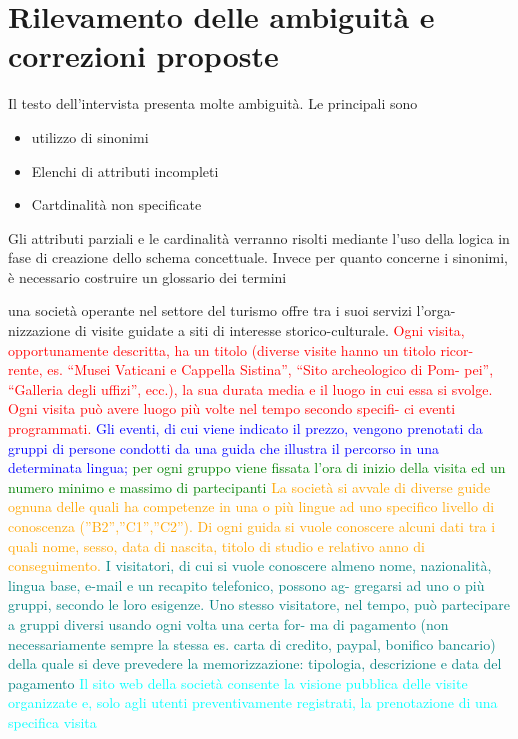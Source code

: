 \documentclass[a4paper,12pt]{report}
\begin{document}
\section{Rilevamento delle ambiguità e correzioni proposte}
Il testo dell'intervista presenta molte ambiguità. Le principali sono
\begin{itemize}
    \item utilizzo di sinonimi
    \item Elenchi di attributi incompleti
    \item Cartdinalità non specificate
\end{itemize}

Gli attributi parziali e le cardinalità verranno risolti mediante l'uso della logica in fase di creazione dello schema concettuale.
Invece per quanto concerne i sinonimi, è necessario costruire un glossario dei termini



una società operante nel settore del turismo offre tra i suoi servizi l’orga-
nizzazione di visite guidate a siti di interesse storico-culturale.
\textcolor{red}{ Ogni visita,
opportunamente descritta, ha un titolo (diverse visite hanno un titolo ricor-
rente, es. “Musei Vaticani e Cappella Sistina”, “Sito archeologico di Pom-
pei”, “Galleria degli uffizi”, ecc.), la sua durata media e il luogo in cui essa
si svolge. Ogni visita può avere luogo più volte nel tempo secondo specifi-
ci eventi programmati. } 
\textcolor{blue}{Gli eventi, di cui viene indicato il prezzo, vengono
prenotati da gruppi di persone condotti da una guida che illustra il percorso
in una determinata lingua;} 
\textcolor{green}{per ogni gruppo viene fissata l’ora di inizio della
visita ed un numero minimo e massimo di partecipanti} 
\textcolor{orange}{La società si avvale
di diverse guide ognuna delle quali ha competenze in una o più 
lingue ad
uno specifico livello di conoscenza (”B2”,”C1”,”C2”). Di ogni guida si vuole
conoscere alcuni dati tra i quali nome, sesso, data di nascita, titolo di studio
e relativo anno di conseguimento.} 
\textcolor{teal}{ I visitatori, di cui si vuole conoscere almeno
nome, nazionalità, lingua base, e-mail e un recapito telefonico, possono ag-
gregarsi ad uno o più gruppi, secondo le loro esigenze. Uno stesso visitatore,
nel tempo, può partecipare a gruppi diversi usando ogni volta una certa for-
ma di pagamento (non necessariamente sempre la stessa es. carta di credito,
paypal, bonifico bancario) della quale si deve prevedere la memorizzazione:
tipologia, descrizione e data del pagamento} 
\textcolor{cyan}{ Il sito web della società consente
la visione pubblica delle visite organizzate e, solo agli utenti preventivamente
registrati, la prenotazione di una specifica visita} 
\end{document}
